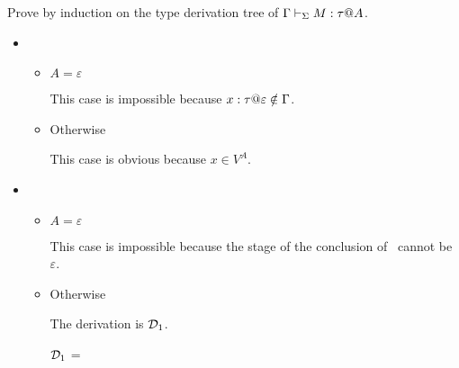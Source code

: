 Prove by induction on the type derivation tree of $\G \V M:\tau@A$.
	
\begin{itemize}
	\item \TVar
	      \begin{itemize}
	      	\item $ A = \varepsilon$
	      	      	      	      	      	      	      	      	      	      	      	      	      	      	      	      		      	      	      	      	      	      	      	      
	      	      This case is impossible because $x:\tau@\varepsilon \notin \G$.
	      	\item Otherwise
	      	      	      	      	      	      	      	      	      	      	      	      	      	      	      	      		      	      	      	      	      	      	      	      
	      	      This case is obvious because $x \in V^A$.
	      \end{itemize}
	      	      	      	      	      	      	      	      		      	      	      	      
	\item \TTBL
	      \begin{itemize}
	      	\item $ A = \varepsilon$
	      	      	      	      	      	      	      	      	      	      	      	      	      	      	      	      		      	      	      	      	      	      	      	      
	      	      This case is impossible because the stage of the conclusion of \TTBL\ cannot be $\varepsilon$.
	      	      	      	      	      	      	      	      	      	      	      	      	      	      	      	      		      	      	      	      	      	      	      	      
	      	\item Otherwise
	      	      	      	      	      	      	      	      	      	      	      	      	      	      	      	      		      	      	      	      	      	      	      	      
	      	      The derivation is $\mathcal{D}_1$.
	      	      	      	      	      	      	      	      	      	      	      	      	      	      	      	      		      	      	      	      	      	      	      	      
	      	      $\mathcal{D}_1$ = 
	      	      {}
	      	      	      	      	      	      	      	      	      	      	      	      	      	      	      	      		      	      	      	      	      	      	      	      

\end{itemize}
\end{itemize}
